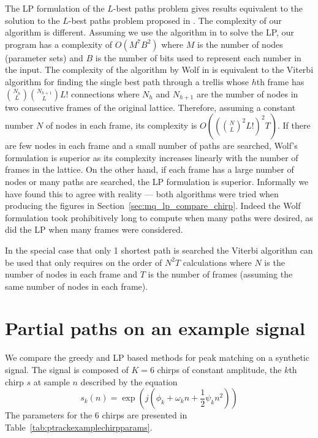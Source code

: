 \documentclass{article}
\begin{document}
\begin{sloppy}
The LP formulation of the $L$-best paths problem gives results equivalent to the
solution to the $L$-best paths problem proposed in \cite{wolf1989finding}. The
complexity of our algorithm is different.  Assuming we
use the algorithm in \cite{karmarkar1984new} to solve the LP, our program has a
complexity of $O(M^{7}B^{2})$ where $M$ is the number of nodes (parameter sets)
and $B$ is the number of bits used to represent each number in the input. The
complexity of the algorithm by Wolf in \cite{wolf1989finding} is equivalent to
the Viterbi algorithm for finding the single best path through a trellis whose
$h$th frame has $\binom{N_{h}}{L}\binom{N_{h+1}}{L}L!$ connections where $N_{h}$
and $N_{h+1}$ are the number of nodes in two consecutive frames of the original
lattice. Therefore, assuming a constant number $N$ of nodes in each frame, its
complexity is $O((\binom{N}{L}^{2}L!)^{2}T)$. If there are few nodes in each
frame and a small number of paths are searched, Wolf's formulation is superior
as its complexity increases linearly with the number of frames in the lattice.
On the other hand, if each frame has a large number of nodes or many paths are
searched, the LP formulation is superior.  Informally we have found this to
agree with reality --- both algorithms were tried when producing the figures in
Section~\ref{sec:mq_lp_compare_chirp}.  Indeed the Wolf formulation took
prohibitively long to compute when many paths were desired, as did the LP when
many frames were considered.

In the special case that only 1 shortest path is searched the Viterbi algorithm
\cite{forney1973viterbi} can be used that only requires on the order of $N^{2}T$
calculations \cite{rabiner1989tutorial} where $N$ is the number of nodes in each
frame and $T$ is the number of frames (assuming the same number of nodes in each
frame).

\section{Partial paths on an example signal\label{sec:mq_lp_compare_chirp}}

We compare the greedy and LP based methods for peak matching on a synthetic
signal. The signal is composed of $K=6$ chirps of constant amplitude, the $k$th
chirp $s$ at sample $n$ described by the equation
\[
    s_{k}(n) = \exp(j(\phi_{k} + \omega_{k}n +
    \frac{1}{2} \psi_{k} n^{2}))
\]
The parameters for the 6 chirps are presented in
Table~\ref{tab:ptrackexamplechirpparams}.


\end{sloppy}
\end{document}
